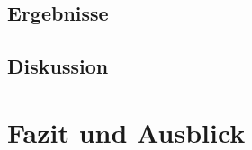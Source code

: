 \documentclass[
a4paper, 
11pt, 
ngerman,
listof=totoc,
bibliography=totocnumbered,
abstracton
]{scrreprt}
\begin{document}
\section{Ergebnisse}

\section{Diskussion}

\chapter{Fazit und Ausblick}


\printbibliography

% 
% 
%

\end{document}
